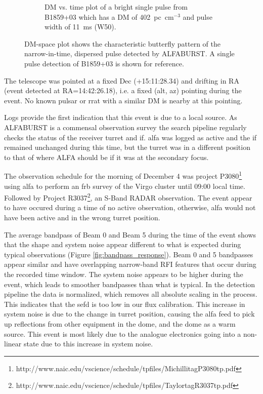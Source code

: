 \documentclass[a4paper,fleqn,usenatbib]{mnras}
\begin{document}
\begin{figure}
\begin{subfigure}[t]{0.5\textwidth}
        \caption{DM vs. time plot of a bright single pulse from B1859+03 which
        has a DM of 402~pc~cm$^{-3}$ and pulse width of 11~ms (W50).
        }
        \label{fig:dm_time_B1859}
    \end{subfigure}
    \caption{DM-space plot shows the characteristic butterfly pattern of the
    narrow-in-time, dispersed pulse detected by ALFABURST. A single pulse
    detection of B1859+03 is shown for reference.
    }
    \label{fig:dm_time}
\end{figure}

The telescope was pointed at a fixed Dec (+15:11:28.34) and drifting in RA
(event detected at RA=14:42:26.18), i.e. a fixed (alt, az) pointing during the
event. No known pulsar or \gls{rrat} with a similar DM is nearby at this pointing.

Logs provide the first indication that this event is due to a local source.  As
ALFABURST is a commensal observation survey the search pipeline regularly checks
the status of the receiver turret and \gls{if}. \gls{alfa} was logged as active and
the \gls{if} remained unchanged during this time, but the turret was in a
different position to that of where ALFA should be if it was at the secondary
focus.

The observation schedule for the morning of December 4 was project
P3080\footnote{http://www.naic.edu/vscience/schedule/tpfiles/MichillitagP3080tp.pdf}
using \gls{alfa} to perform an \gls{frb} survey of the Virgo cluster until 09:00
local time.  Followed by Project
R3037\footnote{http://www.naic.edu/vscience/schedule/tpfiles/TaylortagR3037tp.pdf},
an S-Band RADAR observation.  The event appear to have occured during a time of
no active observation, otherwise, \gls{alfa} would not have been active and in
the wrong turret position.

The average bandpass of Beam 0 and Beam 5 during the time of the event shows
that the shape and system noise appear different to what is expected during
typical observations (Figure \ref{fig:bandpass_response}).  Beam 0 and 5
bandpasses appear similar and have overlapping narrow-band RFI features that
occur during the recorded time window.  The system noise appears to be higher
during the event, which leads to smoother bandpasses than what is typical.  In
the detection pipeline the data is normalized, which removes all absolute
scaling in the process. This indicates that the \gls{sefd} is too low in our
flux calibration.  This increase in system noise is due to the change in turret
position, causing the \gls{alfa} feed to pick up reflections from other
equipment in the dome, and the dome as a warm source.  This event is most likely
due to the analogue electronics going into a non-linear state due to this
increase in system noise.
\end{document}

